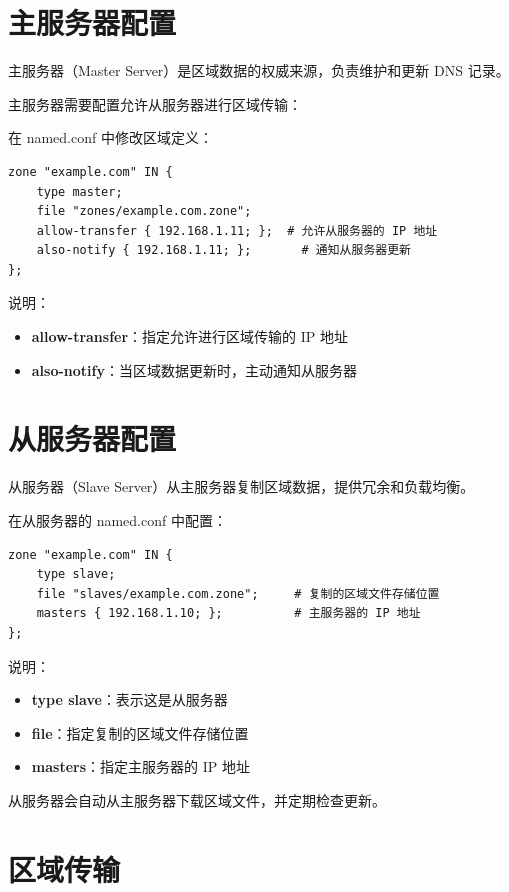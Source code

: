 \documentclass[12pt,UTF8]{ctexbook}
\begin{document}
\section{主服务器配置}
\label{sec:master_config}

主服务器（Master Server）是区域数据的权威来源，负责维护和更新 DNS 记录。

主服务器需要配置允许从服务器进行区域传输：

在 named.conf 中修改区域定义：
\begin{verbatim}
zone "example.com" IN {
    type master;
    file "zones/example.com.zone";
    allow-transfer { 192.168.1.11; };  # 允许从服务器的 IP 地址
    also-notify { 192.168.1.11; };       # 通知从服务器更新
};
\end{verbatim}

说明：
\begin{itemize}
    \item \textbf{allow-transfer}：指定允许进行区域传输的 IP 地址
    \item \textbf{also-notify}：当区域数据更新时，主动通知从服务器
\end{itemize}

\section{从服务器配置}
\label{sec:slave_config}

从服务器（Slave Server）从主服务器复制区域数据，提供冗余和负载均衡。

在从服务器的 named.conf 中配置：
\begin{verbatim}
zone "example.com" IN {
    type slave;
    file "slaves/example.com.zone";     # 复制的区域文件存储位置
    masters { 192.168.1.10; };          # 主服务器的 IP 地址
};
\end{verbatim}

说明：
\begin{itemize}
    \item \textbf{type slave}：表示这是从服务器
    \item \textbf{file}：指定复制的区域文件存储位置
    \item \textbf{masters}：指定主服务器的 IP 地址
\end{itemize}

从服务器会自动从主服务器下载区域文件，并定期检查更新。

\section{区域传输}
\label{sec:zone_transfer}
\end{document}
